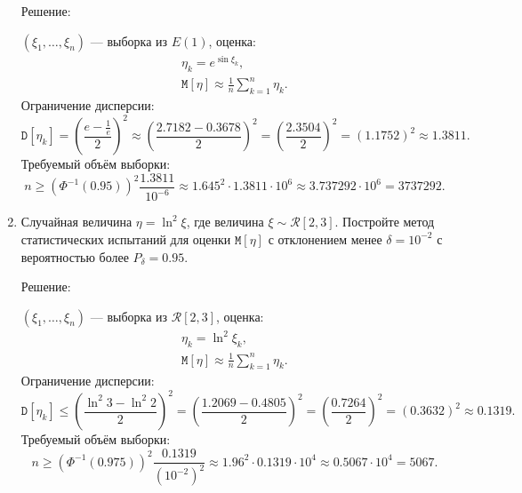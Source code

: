 \documentclass[a4paper,12pt]{article}
\newcommand{\expectation}[1]{\mathtt{M} \left[ #1 \right]}
\newcommand{\variance}[1]{\mathtt{D} \left[ #1 \right]}
\begin{document}
\begin{enumerate}
            Решение:

            $(\xi_1, \dots, \xi_n)$ --- выборка из $E(1)$, оценка:
            \begin{gather*}
                  \eta_k = e^{\sin \xi_k} , \\
                  \expectation{\eta} \approx \frac{1}{n} \sum_{k=1}^n \eta_k .
            \end{gather*}
            Ограничение дисперсии:
            \[
                  \variance{\eta_k}
                  = \left( \frac{e - \frac{1}{e}}{2} \right)^2
                  \approx \left( \frac{2.7182 - 0.3678}{2} \right)^2
                  = \left( \frac{2.3504}{2} \right)^2
                  = \left( 1.1752 \right)^2
                  \approx 1.3811.
            \]
            Требуемый объём выборки:
            \[
                  n
                  \ge \left( \Phi^{-1} \left( 0.95 \right) \right)^2 \frac{1.3811}{10^{-6}}
                  \approx 1.645^2 \cdot 1.3811 \cdot 10^6
                  \approx 3.737292 \cdot 10^6
                  = 3 737 292 .
            \]

            \item Случайная величина $\eta = \ln^2 \xi$, где величина $\xi \sim \mathcal{R}[2, 3]$. Постройте метод статистических испытаний для оценки
            $\expectation{\eta}$ с отклонением менее $\delta = 10^{-2}$ с вероятностью более $P_\delta = 0.95$.

            Решение:

            $(\xi_1, \dots, \xi_n)$ --- выборка из $\mathcal{R}[2, 3]$, оценка:
            \begin{gather*}
                  \eta_k = \ln^2 \xi_k , \\
                  \expectation{\eta} \approx \frac{1}{n} \sum_{k=1}^n \eta_k .
            \end{gather*}
            Ограничение дисперсии:
            \[
                  \variance{\eta_k}
                  \le \left( \frac{\ln^2 3 - \ln^2 2}{2} \right)^2
                  = \left( \frac{1.2069 - 0.4805}{2} \right)^2
                  = \left( \frac{0.7264}{2} \right)^2
                  = \left( 0.3632 \right)^2
                  \approx 0.1319 .
            \]
            Требуемый объём выборки:
            \[
                  n
                  \ge \left( \Phi^{-1} \left( 0.975 \right) \right)^2 \frac{0.1319}{\left( 10^{-2} \right)^2}
                  \approx 1.96^2 \cdot 0.1319 \cdot 10^4
                  \approx 0.5067 \cdot 10^4
                  = 5067 .
            \]


\end{enumerate}
\end{document}
